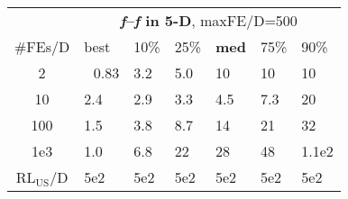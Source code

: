\begin{tabular}{c|llllll}
 & \multicolumn{6}{|c}{\textbf{\textit{f}\raisebox{-0.35ex}{1}--\textit{f}\raisebox{-0.35ex}{24} in 5-D}, maxFE/D=500}\\
\#FEs/D & best & 10\% & 25\% & \textbf{med} & 75\% & 90\%\\
2 & ~\,0.83 & \hspace*{1ex}3.2 & \hspace*{1ex}5.0 & 10 & 10 & 10\\
10 & \hspace*{1ex}2.4 & \hspace*{1ex}2.9 & \hspace*{1ex}3.3 & \hspace*{1ex}4.5 & \hspace*{1ex}7.3 & 20\\
100 & \hspace*{1ex}1.5 & \hspace*{1ex}3.8 & \hspace*{1ex}8.7 & 14 & 21 & 32\\
1e3 & \hspace*{1ex}1.0 & \hspace*{1ex}6.8 & 22 & 28 & 48 & 1.1e2\\
$\text{RL}_{\text{US}}$/D & 5e2 & 5e2 & 5e2 & 5e2 & 5e2 & 5e2
\end{tabular}
